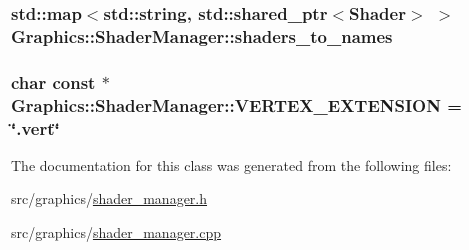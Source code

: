 \subsubsection[{shaders\+\_\+to\+\_\+names}]{\setlength{\rightskip}{0pt plus 5cm}std\+::map$<$std\+::string, std\+::shared\+\_\+ptr$<${\bf Shader}$>$ $>$ Graphics\+::\+Shader\+Manager\+::shaders\+\_\+to\+\_\+names\hspace{0.3cm}{\ttfamily [private]}}\label{class_graphics_1_1_shader_manager_a5cada9e001d0b2ead2bfb7a0ef37be66}
\hypertarget{class_graphics_1_1_shader_manager_abb954de5b5b6bc56d568e20b478f0712}{}
\subsubsection[{V\+E\+R\+T\+E\+X\+\_\+\+E\+X\+T\+E\+N\+S\+I\+O\+N}]{\setlength{\rightskip}{0pt plus 5cm}char const $\ast$ Graphics\+::\+Shader\+Manager\+::\+V\+E\+R\+T\+E\+X\+\_\+\+E\+X\+T\+E\+N\+S\+I\+O\+N = \char`\"{}.vert\char`\"{}\hspace{0.3cm}{\ttfamily [static]}}\label{class_graphics_1_1_shader_manager_abb954de5b5b6bc56d568e20b478f0712}


The documentation for this class was generated from the following files\+:\begin{DoxyCompactItemize}
\item 
src/graphics/\hyperlink{shader__manager_8h}{shader\+\_\+manager.\+h}\item 
src/graphics/\hyperlink{shader__manager_8cpp}{shader\+\_\+manager.\+cpp}\end{DoxyCompactItemize}

